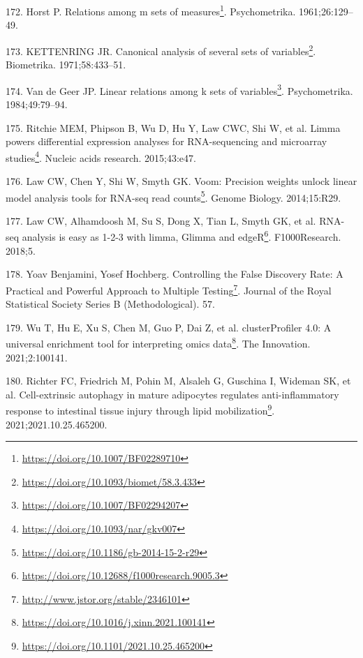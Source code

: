 \documentclass[
  a4paper,
]{book}
\DeclareRobustCommand{\href}[2]{#2\footnote{\url{#1}}}
\newlength{\cslhangindent}
\newlength{\cslentryspacingunit} %
\newenvironment{CSLReferences}[2] %
 {%
  \setlength{\parindent}{0pt}
  \ifodd #1
  \let\oldpar\par
  \def\par{\hangindent=\cslhangindent\oldpar}
  \fi
  \setlength{\parskip}{#2\cslentryspacingunit}
 }%
 {}
\begin{document}
\begin{CSLReferences}{0}{0}
\leavevmode{}%
172. Horst P. \href{https://doi.org/10.1007/BF02289710}{Relations among m sets of measures}. Psychometrika. 1961;26:129--49.

\leavevmode{}%
173. KETTENRING JR. \href{https://doi.org/10.1093/biomet/58.3.433}{Canonical analysis of several sets of variables}. Biometrika. 1971;58:433--51.

\leavevmode{}%
174. Van de Geer JP. \href{https://doi.org/10.1007/BF02294207}{Linear relations among k sets of variables}. Psychometrika. 1984;49:79--94.

\leavevmode{}%
175. Ritchie MEM, Phipson B, Wu D, Hu Y, Law CWC, Shi W, et al. \href{https://doi.org/10.1093/nar/gkv007}{Limma powers differential expression analyses for RNA-sequencing and microarray studies}. Nucleic acids research. 2015;43:e47.

\leavevmode{}%
176. Law CW, Chen Y, Shi W, Smyth GK. \href{https://doi.org/10.1186/gb-2014-15-2-r29}{Voom: Precision weights unlock linear model analysis tools for RNA-seq read counts}. Genome Biology. 2014;15:R29.

\leavevmode{}%
177. Law CW, Alhamdoosh M, Su S, Dong X, Tian L, Smyth GK, et al. \href{https://doi.org/10.12688/f1000research.9005.3}{RNA-seq analysis is easy as 1-2-3 with limma, Glimma and edgeR}. F1000Research. 2018;5.

\leavevmode{}%
178. Yoav Benjamini, Yosef Hochberg. \href{http://www.jstor.org/stable/2346101}{Controlling the False Discovery Rate: A Practical and Powerful Approach to Multiple Testing}. Journal of the Royal Statistical Society Series B (Methodological). 57.

\leavevmode{}%
179. Wu T, Hu E, Xu S, Chen M, Guo P, Dai Z, et al. \href{https://doi.org/10.1016/j.xinn.2021.100141}{clusterProfiler 4.0: A universal enrichment tool for interpreting omics data}. The Innovation. 2021;2:100141.

\leavevmode{}%
180. Richter FC, Friedrich M, Pohin M, Alsaleh G, Guschina I, Wideman SK, et al. \href{https://doi.org/10.1101/2021.10.25.465200}{Cell-extrinsic autophagy in mature adipocytes regulates anti-inflammatory response to intestinal tissue injury through lipid mobilization}. 2021;2021.10.25.465200.


\end{CSLReferences}
\end{document}
